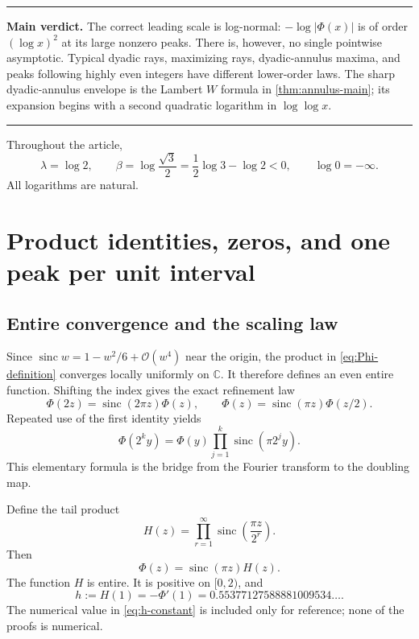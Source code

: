 \documentclass[11pt,oneside]{article}
\theoremstyle{definition}
\theoremstyle{remark}
\newcommand{\C}{\mathbb C}
\newcommand{\sinc}{\operatorname{sinc}}
\newcommand{\bigO}{\mathcal O}
\newcommand{\PhiF}{\Phi}
\newenvironment{boxedremark}{%
  \par\smallskip\noindent\begin{center}\begin{minipage}{0.94\textwidth}%
  \color{black}\hrule\vspace{0.6em}\small
}{%
  \vspace{0.6em}\hrule\end{minipage}\end{center}\smallskip
}
\begin{document}
\begin{boxedremark}
\textbf{Main verdict.}
The correct leading scale is log-normal:
\(-\log|\PhiF(x)|\) is of order \((\log x)^2\) at its large nonzero peaks.
There is, however, no single pointwise asymptotic.  Typical dyadic rays,
maximizing rays, dyadic-annulus maxima, and peaks following highly even
integers have different lower-order laws.  The sharp dyadic-annulus envelope
is the Lambert \(W\) formula in \cref{thm:annulus-main}; its expansion begins
with a second quadratic logarithm in \(\log\log x\).
\end{boxedremark}

Throughout the article,
\begin{equation}
 \lambda=\log2,
 \qquad
 \beta=\log\frac{\sqrt3}{2}=\frac12\log3-\log2<0,
 \qquad
 \log0=-\infty.
 \label{eq:constants-lambda-beta}
\end{equation}
All logarithms are natural.

\section{Product identities, zeros, and one peak per unit interval}
\label{sec:basic}

\subsection{Entire convergence and the scaling law}

Since
\(
 \sinc w=1-w^2/6+\bigO(w^4)
\)
near the origin, the product in \eqref{eq:Phi-definition} converges locally
uniformly on \(\C\).  It therefore defines an even entire function.  Shifting
the index gives the exact refinement law
\begin{equation}
 \PhiF(2z)=\sinc(2\pi z)\PhiF(z),
 \qquad
 \PhiF(z)=\sinc(\pi z)\PhiF(z/2).
 \label{eq:Phi-scaling}
\end{equation}
Repeated use of the first identity yields
\begin{equation}
 \PhiF(2^k y)=\PhiF(y)
 \prod_{j=1}^{k}\sinc(\pi2^j y).
 \label{eq:Phi-ray-product}
\end{equation}
This elementary formula is the bridge from the Fourier transform to the
doubling map.

Define the tail product
\begin{equation}
 H(z)=\prod_{r=1}^{\infty}
 \sinc\!\left(\frac{\pi z}{2^r}\right).
 \label{eq:H-definition}
\end{equation}
Then
\begin{equation}
 \PhiF(z)=\sinc(\pi z)H(z).
 \label{eq:Phi-H}
\end{equation}
The function \(H\) is entire.  It is positive on \([0,2)\), and
\begin{equation}
 h:=H(1)=-\PhiF'(1)
 =0.55377127588881009534\ldots.
 \label{eq:h-constant}
\end{equation}
The numerical value in \eqref{eq:h-constant} is included only for reference;
none of the proofs is numerical.
\end{document}
